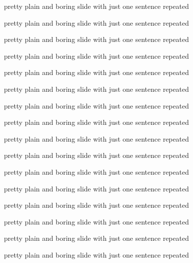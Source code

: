 
\begin{frame}
	pretty plain and boring slide with just one sentence repeated

	pretty plain and boring slide with just one sentence repeated

	pretty plain and boring slide with just one sentence repeated
	
	pretty plain and boring slide with just one sentence repeated

	pretty plain and boring slide with just one sentence repeated

	pretty plain and boring slide with just one sentence repeated

	pretty plain and boring slide with just one sentence repeated

	pretty plain and boring slide with just one sentence repeated

	pretty plain and boring slide with just one sentence repeated

	pretty plain and boring slide with just one sentence repeated

	pretty plain and boring slide with just one sentence repeated

	pretty plain and boring slide with just one sentence repeated

	pretty plain and boring slide with just one sentence repeated

	pretty plain and boring slide with just one sentence repeated

	pretty plain and boring slide with just one sentence repeated

	pretty plain and boring slide with just one sentence repeated
\end{frame}